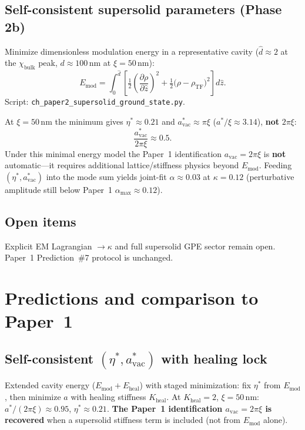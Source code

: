 \documentclass[11pt,a4paper]{article}
\begin{document}
\subsection{Self-consistent supersolid parameters (Phase 2b)}

Minimize dimensionless modulation energy in a representative cavity
($\hat d \approx 2$ at the $\chi_{\mathrm{bulk}}$ peak, $d \approx 100$\,nm at $\xi = 50$\,nm):
\begin{equation}
  E_{\mathrm{mod}} = \int_0^{\hat d}
  \left[\tfrac12\left(\frac{\partial\rho}{\partial\hat z}\right)^2
  + \tfrac12\bigl(\rho - \rho_{\mathrm{TF}}\bigr)^2\right] d\hat z.
\end{equation}
Script: \texttt{ch\_paper2\_supersolid\_ground\_state.py}.

At $\xi = 50$\,nm the minimum gives $\eta^* \approx 0.21$ and
$a_{\mathrm{vac}}^* \approx \pi\xi$ ($a^*/\xi \approx 3.14$), \textbf{not} $2\pi\xi$:
\begin{equation}
  \frac{a_{\mathrm{vac}}^*}{2\pi\xi} \approx 0.5.
\end{equation}
Under this minimal energy model the Paper~1 identification $a_{\mathrm{vac}} = 2\pi\xi$ is
\textbf{not} automatic---it requires additional lattice/stiffness physics beyond
$E_{\mathrm{mod}}$. Feeding $(\eta^*, a_{\mathrm{vac}}^*)$ into the mode sum yields
joint-fit $\alpha \approx 0.03$ at $\kappa = 0.12$ (perturbative amplitude still below
Paper~1 $\alpha_{\max} \approx 0.12$).

\subsection{Open items}

Explicit EM Lagrangian $\to \kappa$ and full supersolid GPE sector remain open.
Paper~1 Prediction~\#7 protocol is unchanged.

\section{Predictions and comparison to Paper~1}
\label{sec:predictions}

\subsection{Self-consistent \texorpdfstring{$(\eta^*, a_{\mathrm{vac}}^*)$}{(eta*, a\_vac*)} with healing lock}

Extended cavity energy ($E_{\mathrm{mod}} + E_{\mathrm{heal}}$) with staged minimization:
fix $\eta^*$ from $E_{\mathrm{mod}}$, then minimize $a$ with healing stiffness $K_{\mathrm{heal}}$.
At $K_{\mathrm{heal}} = 2$, $\xi = 50$\,nm:
$a^*/(2\pi\xi) \approx 0.95$, $\eta^* \approx 0.21$.
\textbf{The Paper~1 identification $a_{\mathrm{vac}} = 2\pi\xi$ is recovered} when a supersolid stiffness term is included (not from $E_{\mathrm{mod}}$ alone).
\end{document}

